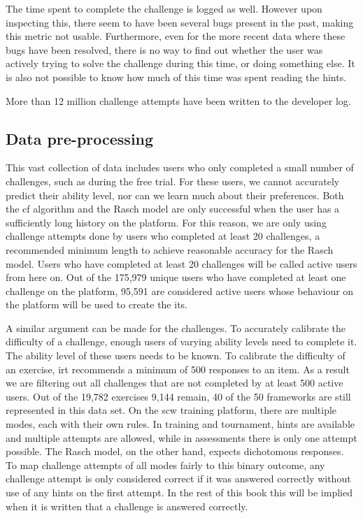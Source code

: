 The time spent to complete the challenge is logged as well.
However upon inspecting this, there seem to have been several bugs present in the past, making this metric not usable.
Furthermore, even for the more recent data where these bugs have been resolved, there is no way to find out whether the user was actively trying to solve the challenge during this time, or doing something else.
It is also not possible to know how much of this time was spent reading the hints.

More than 12 million challenge attempts have been written to the developer log.

\subsection{Data pre-processing}
This vast collection of data includes users who only completed a small number of challenges, such as during the free trial.
For these users, we cannot accurately predict their ability level, nor can we learn much about their preferences.
Both the \gls{cf} algorithm and the Rasch model are only successful when the user has a sufficiently long history on the platform.
For this reason, we are only using challenge attempts done by users who completed at least 20 challenges, a recommended minimum length to achieve reasonable accuracy for the Rasch model.
Users who have completed at least 20 challenges will be called active users from here on.
Out of the 175,979 unique users who have completed at least one challenge on the platform, 95,591 are considered active users whose behaviour on the platform will be used to create the \gls{its}.

A similar argument can be made for the challenges.
To accurately calibrate the difficulty of a challenge, enough users of varying ability levels need to complete it.
The ability level of these users needs to be known.
To calibrate the difficulty of an exercise, \gls{irt} recommends a minimum of 500 responses to an item.
As a result we are filtering out all challenges that are not completed by at least 500 active users.
Out of the 19,782 exercises 9,144 remain, 40 of the 50 frameworks are still represented in this data set.
On the \gls{scw} training platform, there are multiple modes, each with their own rules.
In training and tournament, hints are available and multiple attempts are allowed, while in assessments there is only one attempt possible.
The Rasch model, on the other hand, expects dichotomous responses.
To map challenge attempts of all modes fairly to this binary outcome, any challenge attempt is only considered correct if it was answered correctly without use of any hints on the first attempt.
In the rest of this book this will be implied when it is written that a challenge is answered correctly.

